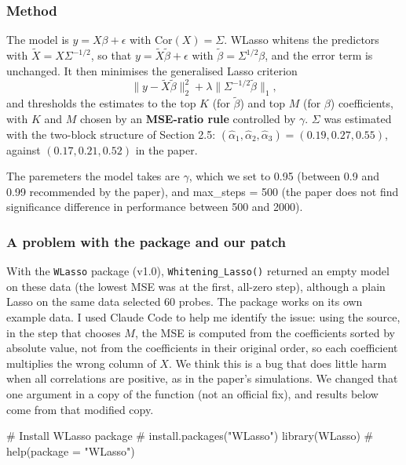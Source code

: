 \documentclass[
  letterpaper,
  DIV=11,
  numbers=noendperiod]{scrartcl}
\newenvironment{Shaded}{\begin{snugshade}}{\end{snugshade}}
\newcommand{\CommentTok}[1]{\textcolor[rgb]{0.37,0.37,0.37}{#1}}
\newcommand{\FunctionTok}[1]{\textcolor[rgb]{0.28,0.35,0.67}{#1}}
\newcommand{\NormalTok}[1]{\textcolor[rgb]{0.00,0.23,0.31}{#1}}
\begin{document}
\hypertarget{method}{%
\subsubsection{Method}\label{method}}

The model is \(y = X\beta + \epsilon\) with
\(\mathrm{Cor}(X) = \Sigma\). WLasso whitens the predictors with
\(\tilde{X} = X\Sigma^{-1/2}\), so that
\(y = \tilde{X}\tilde\beta + \epsilon\) with
\(\tilde\beta = \Sigma^{1/2}\beta\), and the error term is unchanged. It
then minimises the generalised Lasso criterion
\[\|y - \tilde{X}\tilde\beta\|_2^2 + \lambda \|\Sigma^{-1/2}\tilde\beta\|_1,\]
and thresholds the estimates to the top \(K\) (for \(\tilde\beta\)) and
top \(M\) (for \(\beta\)) coefficients, with \(K\) and \(M\) chosen by
an \textbf{MSE-ratio rule} controlled by \(\gamma\). \(\Sigma\) was
estimated with the two-block structure of Section 2.5:
\((\hat\alpha_1,\hat\alpha_2,\hat\alpha_3) = (0.19, 0.27, 0.55)\),
against \((0.17, 0.21, 0.52)\) in the paper.

The paremeters the model takes are \(\gamma\), which we set to 0.95
(between 0.9 and 0.99 recommended by the paper), and max\_steps = 500
(the paper does not find significance difference in performance between
500 and 2000).

\hypertarget{a-problem-with-the-package-and-our-patch}{%
\subsubsection{A problem with the package and our
patch}\label{a-problem-with-the-package-and-our-patch}}

With the \texttt{WLasso} package (v1.0), \texttt{Whitening\_Lasso()}
returned an empty model on these data (the lowest MSE was at the first,
all-zero step), although a plain Lasso on the same data selected 60
probes. The package works on its own example data. I used Claude Code to
help me identify the issue: using the source, in the step that chooses
\(M\), the MSE is computed from the coefficients sorted by absolute
value, not from the coefficients in their original order, so each
coefficient multiplies the wrong column of \(X\). We think this is a bug
that does little harm when all correlations are positive, as in the
paper's simulations. We changed that one argument in a copy of the
function (not an official fix), and results below come from that
modified copy.

\begin{Shaded}
\begin{Highlighting}[]
\CommentTok{\# Install WLasso package}
\CommentTok{\# install.packages("WLasso")}
\FunctionTok{library}\NormalTok{(WLasso)}
\CommentTok{\# help(package = "WLasso")}
\end{Highlighting}
\end{Shaded}
\end{document}
